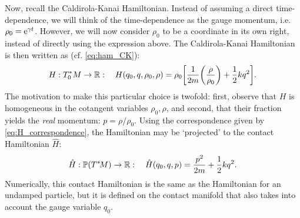 Now, recall the Caldirola-Kanai Hamiltonian. Instead of assuming a direct time-dependence, we will think of the time-dependence as the gauge momentum, i.e. $\rho_0 = \mathrm{e}^{\gamma t}$. However, we will now consider $\rho_0$ to be a coordinate in its own right, instead of directly using the expression above. The Caldirola-Kanai Hamiltonian is then written as (cf. \cref{eq:ham_CK}):
\begin{equation}
    H: T^*_0M \to \mathbb{R}: \quad H(q_0, q, \rho_0, \rho) = \rho_0 \qty[\frac{1}{2m}\qty(\frac{\rho}{\rho_0}) + \frac{1}{2}kq^2]. 
    \label{eq:homo_hck}
\end{equation}
The motivation to make this particular choice is twofold: first, observe that $H$ is homogeneous in the cotangent variables $\rho_0, \rho$, and second, that their fraction yields the \emph{real} momentum: $ p = \rho/\rho_0 $. Using the correspondence given by \cref{eq:H_correspondence}, the Hamiltonian may be `projected' to the contact Hamiltonian $\hat{H}$:
\begin{equation}
    \hat{H}: \mathbb{P}\qty(T^*\!M) \to \mathbb{R}: \quad \hat{H}(q_0, q, p) = \frac{p^2}{2m} + \frac{1}{2}kq^2.
\end{equation}
Numerically, this contact Hamiltonian is the same as the Hamiltonian for an undamped particle, but it is defined on the contact manifold that also takes into account the gauge variable $q_0$. 




